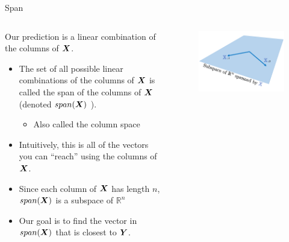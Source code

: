 \documentclass[aspectratio=169]{../latex_main/tntbeamer}  %
\begin{document}
	\begin{frame}{Span}
	    \begin{columns}
	        \begin{column}{.5\textwidth}
	                Our prediction is a linear combination of the columns of $\bm{X}$. 
	                \begin{itemize}
	                    \item The set of all possible linear combinations of the columns of $\bm{X}$ is called the span of the columns of $\bm{X}$ (denoted      $span(\bm{X})$           ).
	                    \begin{itemize}
	                        \item Also called the column space
	                    \end{itemize}
                        \item Intuitively, this is all of the vectors you can “reach” using the columns of $\bm{X}$.
                        \item Since each column of $\bm{X}$ has length $n$, $span(\bm{X})$ is a subspace of $\mathbb{R}^n$    
                        \item Our goal is to find the vector in $span(\bm{X})$ that is closest to  $\bm{Y}$. 
	                \end{itemize}
	        \end{column}
	        \begin{column}{.4\textwidth}
	                \begin{figure}
	                    \includegraphics[scale=.45]{Bild6}
	                \end{figure}
	        \end{column}
	    \end{columns}
	\end{frame}
	 
\end{document}
